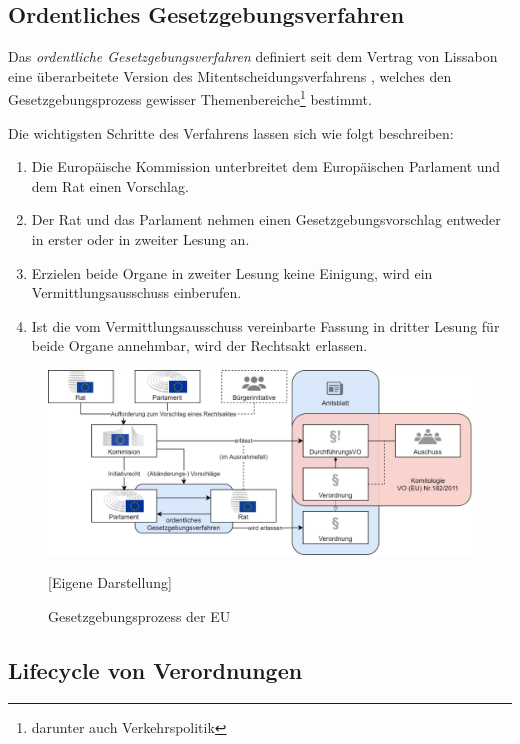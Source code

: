         \subsection{Ordentliches Gesetzgebungsverfahren} \label{ch:ord_ggv}

Das \textit{ordentliche Gesetzgebungsverfahren} definiert seit dem Vertrag von Lissabon eine überarbeitete Version des Mitentscheidungsverfahrens \cite[Art. 294]{AEUV}, welches den Gesetzgebungsprozess gewisser Themenbereiche\footnote{darunter auch Verkehrspolitik} bestimmt. 

Die wichtigsten Schritte des Verfahrens lassen sich wie folgt beschreiben:
\begin{enumerate}
    \item Die Europäische Kommission unterbreitet dem Europäischen Parlament und dem Rat einen Vorschlag.
    \item Der Rat und das Parlament nehmen einen Gesetzgebungsvorschlag entweder in erster oder in zweiter Lesung an.
    \item Erzielen beide Organe in zweiter Lesung keine Einigung, wird ein Vermittlungsausschuss einberufen.
    \item Ist die vom Vermittlungsausschuss vereinbarte Fassung in dritter Lesung für beide Organe annehmbar, wird der Rechtsakt erlassen.
\end{enumerate}

    \begin{figure}[H]
        \centering
        \includegraphics[width=\linewidth]{gfx/Gesegebungsprozess.png}
        \caption{Gesetzgebungsprozess der EU} 
        [Eigene Darstellung]
        \label{fig:europeg}
    \end{figure}
        

        
\subsection{Lifecycle von Verordnungen}

